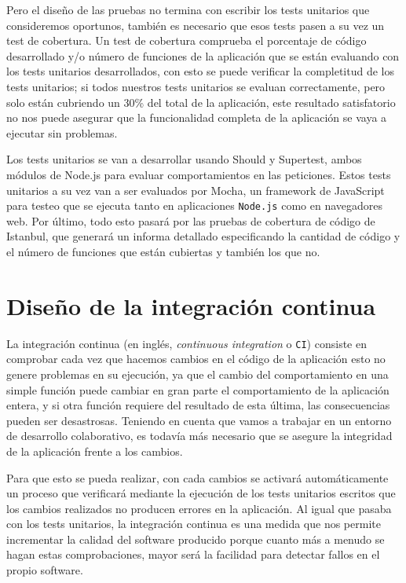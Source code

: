 Pero el diseño de las pruebas no termina con escribir los tests unitarios que consideremos oportunos, también es necesario que
esos tests pasen a su vez un test de cobertura. Un test de cobertura comprueba el porcentaje de código desarrollado y/o
número de funciones de la aplicación que se están evaluando con los tests unitarios desarrollados, con esto se puede verificar
la completitud de los tests unitarios; si todos nuestros tests unitarios se evaluan correctamente, pero solo están cubriendo
un 30\% del total de la aplicación, este resultado satisfatorio no nos puede asegurar que la funcionalidad completa de la 
aplicación se vaya a ejecutar sin problemas.

\bigskip
Los tests unitarios se van a desarrollar usando Should y Supertest, ambos módulos de Node.js para evaluar comportamientos en las
peticiones. Estos tests unitarios a su vez van a ser evaluados por Mocha, un framework de JavaScript para testeo que se ejecuta
tanto en aplicaciones {\tt Node.js} como en navegadores web. Por último, todo esto pasará por las pruebas de cobertura de código de 
Istanbul, que generará un informa detallado especificando la cantidad de código y el número de funciones que están cubiertas y
también los que no.

\section{Diseño de la integración continua}

La integración continua (en inglés, \textit{continuous integration} o {\tt CI}) consiste en comprobar cada vez que hacemos
cambios en el código de la aplicación esto no genere problemas en su ejecución, ya que el cambio del comportamiento en una 
simple función puede cambiar en gran parte el comportamiento de la aplicación entera, y si otra función requiere del resultado
de esta última, las consecuencias pueden ser desastrosas. Teniendo en cuenta que vamos a trabajar en un entorno de desarrollo
colaborativo, es todavía más necesario que se asegure la integridad de la aplicación frente a los cambios.

\bigskip
Para que esto se pueda realizar, con cada cambios se activará automáticamente un proceso que verificará mediante la ejecución de
los tests unitarios escritos que los cambios realizados no producen errores en la aplicación. Al igual que pasaba con los tests
unitarios, la integración continua es una medida que nos permite incrementar la calidad del software producido porque cuanto 
más a menudo se hagan estas comprobaciones, mayor será la facilidad para detectar fallos en el propio software.

